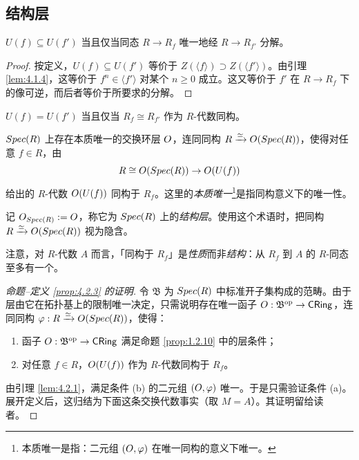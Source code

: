 \subsection{结构层}\label{sec:4.2}

\begin{lemma}\label{lem:4.2.1}
$U(f) \subseteq U(f')$ 当且仅当同态 $R \to R_f$ 唯一地经 $R \to R_{f'}$ 分解。
\end{lemma}

\begin{proof}
按定义，$U(f) \subseteq U(f')$ 等价于 $Z(\langle f\rangle) \supset Z(\langle f'\rangle)$。由引理 \ref{lem:4.1.4}，这等价于 $f^n \in \langle f'\rangle$ 对某个 $n \ge 0$ 成立。这又等价于 $f'$ 在 $R \to R_f$ 下的像可逆，而后者等价于所要求的分解。
\end{proof}

\begin{corollary}\label{cor:4.2.2}
$U(f) = U(f')$ 当且仅当 $R_f \cong R_{f'}$ 作为 $R$-代数同构。
\end{corollary}

\begin{propdef}\label{prop:4.2.3}
$Spec(R)$ 上存在本质唯一的交换环层 $O$，连同同构 $R \xrightarrow{\simeq} O(Spec(R))$，使得对任意 $f \in R$，由
\[
R \cong O(Spec(R)) \to O(U(f))
\]
给出的 $R$-代数 $O(U(f))$ 同构于 $R_f$。这里的\emph{本质唯一}\footnote{本质唯一是指：二元组 $(O,\varphi)$ 在唯一同构的意义下唯一。}是指同构意义下的唯一性。
\end{propdef}

记 $O_{Spec(R)} := O$，称它为 $Spec(R)$ 上的\emph{结构层}。使用这个术语时，把同构 $R \xrightarrow{\simeq} O(Spec(R))$ 视为隐含。

\begin{remark}\label{rem:4.2.4}
注意，对 $R$-代数 $A$ 而言，「同构于 $R_f$」是\emph{性质}而非\emph{结构}：从 $R_f$ 到 $A$ 的 $R$-同态至多有一个。
\end{remark}

\begin{proof}[命题--定义 \ref{prop:4.2.3} 的证明]
令 $\mathfrak{B}$ 为 $Spec(R)$ 中标准开子集构成的范畴。由于层由它在拓扑基上的限制唯一决定，只需说明存在唯一函子 $O : \mathfrak{B}^{\mathrm{op}} \to \mathsf{CRing}$，连同同构 $\varphi : R \xrightarrow{\simeq} O(Spec(R))$，使得：
\begin{enumerate}[label=(\alph*),leftmargin=2em,itemsep=0.25ex]
  \item 函子 $O : \mathfrak{B}^{\mathrm{op}} \to \mathsf{CRing}$ 满足命题 \ref{prop:1.2.10} 中的层条件；
  \item 对任意 $f \in R$，$O(U(f))$ 作为 $R$-代数同构于 $R_f$。
\end{enumerate}

由引理 \ref{lem:4.2.1}，满足条件 (b) 的二元组 $(O,\varphi)$ 唯一。于是只需验证条件 (a)。展开定义后，这归结为下面这条交换代数事实（取 $M=A$）。其证明留给读者。
\end{proof}

